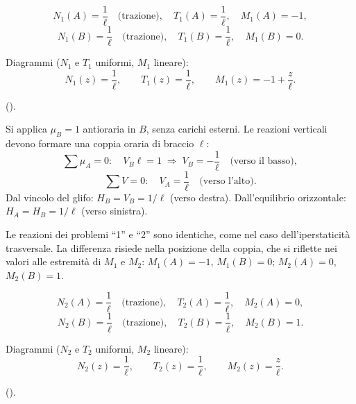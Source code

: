 \begin{esempio}
\begin{svolgimento}
		\[
		N_1(A) = \frac{1}{\ell}
		\quad\text{(trazione)},\quad
		T_1(A) = \frac{1}{\ell},\quad
		M_1(A) = -1,
		\]
		\[
		N_1(B) = \frac{1}{\ell}
		\quad\text{(trazione)},\quad
		T_1(B) = \frac{1}{\ell},\quad
		M_1(B) = 0.
		\]
		
		Diagrammi ($N_1$ e $T_1$ uniformi,
		$M_1$ lineare):
		\[
		N_1(z) = \frac{1}{\ell}, \qquad
		T_1(z) = \frac{1}{\ell}, \qquad
		M_1(z) = -1 + \frac{z}{\ell}.
		\]
		
		().
		



		
		
		Si applica $\mu_B = 1$ antioraria in $B$,
		senza carichi esterni. Le reazioni verticali
		devono formare una coppia oraria di braccio
		$\ell$:
		\[
		\sum \mu_A = 0:\quad
		V_B\ell = 1
		\;\Rightarrow\; V_B = -\frac{1}{\ell}
		\quad\text{(verso il basso)},
		\]
		\[
		\sum V = 0:\quad
		V_A = \frac{1}{\ell}
		\quad\text{(verso l'alto)}.
		\]
		Dal vincolo del glifo: $H_B = V_B =
		1/\ell$ (verso destra).
		Dall'equilibrio orizzontale:
		$H_A = H_B = 1/\ell$ (verso sinistra).
		
		Le reazioni dei problemi ``1'' e ``2'' sono
		identiche, come nel caso dell'iperstaticità
		trasversale. La differenza risiede nella
		posizione della coppia, che si riflette nei
		valori alle estremità di $M_1$ e $M_2$:
		$M_1(A) = -1$, $M_1(B) = 0$;
		$M_2(A) = 0$, $M_2(B) = 1$.
		
		\[
		N_2(A) = \frac{1}{\ell}
		\quad\text{(trazione)},\quad
		T_2(A) = \frac{1}{\ell},\quad
		M_2(A) = 0,
		\]
		\[
		N_2(B) = \frac{1}{\ell}
		\quad\text{(trazione)},\quad
		T_2(B) = \frac{1}{\ell},\quad
		M_2(B) = 1.
		\]
		
		Diagrammi ($N_2$ e $T_2$ uniformi,
		$M_2$ lineare):
		\[
		N_2(z) = \frac{1}{\ell}, \qquad
		T_2(z) = \frac{1}{\ell}, \qquad
		M_2(z) = \frac{z}{\ell}.
		\]
		
		().
		
		



		
	

\end{svolgimento}
\end{esempio}

